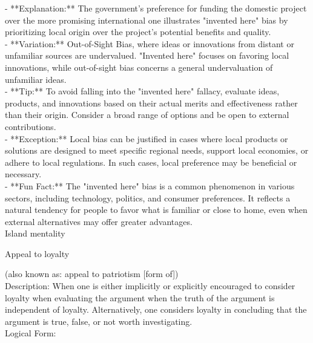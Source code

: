 \documentclass[a4paper,12pt,single,pdftex]{scrbook}
\begin{document}
    
      - **Explanation:** The government’s preference for funding the domestic project over the more promising international one illustrates "invented here" bias by prioritizing local origin over the project’s potential benefits and quality.
    \\

    
      - **Variation:** Out-of-Sight Bias, where ideas or innovations from distant or unfamiliar sources are undervalued. "Invented here" focuses on favoring local innovations, while out-of-sight bias concerns a general undervaluation of unfamiliar ideas.
    \\

    
      - **Tip:** To avoid falling into the "invented here" fallacy, evaluate ideas, products, and innovations based on their actual merits and effectiveness rather than their origin. Consider a broad range of options and be open to external contributions.
    \\

    
      - **Exception:** Local bias can be justified in cases where local products or solutions are designed to meet specific regional needs, support local economies, or adhere to local regulations. In such cases, local preference may be beneficial or necessary.
    \\

    
      - **Fun Fact:** The "invented here" bias is a common phenomenon in various sectors, including technology, politics, and consumer preferences. It reflects a natural tendency for people to favor what is familiar or close to home, even when external alternatives may offer greater advantages.
    \\

  

Island mentality

Appeal to loyalty
    
      (also known as: appeal to patriotism [form of])
    \\

  
    
      
        Description: When one is either implicitly or explicitly encouraged to consider loyalty when evaluating the argument when the truth of the argument is independent of loyalty. Alternatively, one considers loyalty in concluding that the argument is true, false, or not worth investigating.
      \\

      
        Logical Form:
      \\
\end{document}
